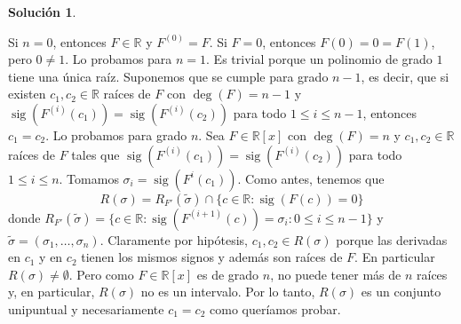 \documentclass[10pt]{article}
\theoremstyle{definition}
\newtheorem*{sol}{Solución}
\newcommand{\RR}{\mathbb{R}}
\newcommand{\RRx}{\mathbb{R}[x]}
\newcommand{\sig}{\operatorname{sig}}
\begin{document}
\begin{sol}
\begin{itemize}
    Si $n=0$, entonces $F\in\RR$ y $F^{(0)}=F$. Si $F=0$, entonces $F(0)=0=F(1)$, pero $0\neq 1$. Lo probamos para $n=1$. Es trivial porque un polinomio de grado $1$ tiene una única raíz. Suponemos que se cumple para grado $n-1$, es decir, que si existen $c_1,c_2\in\RR$ raíces de $F$ con $\deg(F)=n-1$ y $\sig(F^{(i)}(c_1))=\sig(F^{(i)}(c_2))$ para todo $1\leq i\leq n-1$, entonces $c_1=c_2$. Lo probamos para grado $n$. Sea $F\in\RRx$ con $\deg(F)=n$ y $c_1,c_2\in\RR$ raíces de $F$ tales que $\sig(F^{(i)}(c_1))=\sig(F^{(i)}(c_2))$ para todo $1\leq i\leq n$. Tomamos $\sigma_i=\sig(F^{i}(c_1))$. Como antes, tenemos que
    \[R(\sigma)=R_{F'}(\tilde{\sigma})\cap\{c\in\RR : \sig(F(c))=0\}\]
    donde $R_{F'}(\tilde{\sigma})=\{c\in\RR : \sig(F^{(i+1)}(c))=\sigma_i : 0\leq i\leq n-1\}$ y $\tilde{\sigma}=(\sigma_1,\ldots,\sigma_n)$. Claramente por hipótesis, $c_1,c_2\in R(\sigma)$ porque las derivadas en $c_1$ y en $c_2$ tienen los mismos signos y además son raíces de $F$. En particular $R(\sigma)\neq \emptyset$. Pero como $F\in\RRx$ es de grado $n$, no puede tener más de $n$ raíces y, en particular, $R(\sigma)$ no es un intervalo. Por lo tanto, $R(\sigma)$ es un conjunto unipuntual y necesariamente $c_1=c_2$ como queríamos probar.
\end{itemize}
\end{sol}
\end{document}
